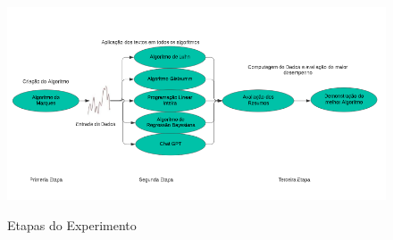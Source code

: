 \begin{figure}[!h]
\centering
    \caption{Etapas do Experimento}
    \includegraphics[width=\textwidth]{figuras/design-experimento.png}
    \label{fig:projeto-experimento}
\end{figure}

